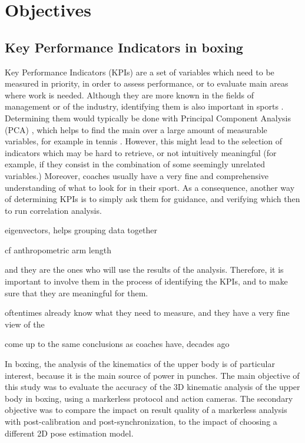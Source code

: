 \clearpage

\minitoc
\newpage






\section{Objectives}

\subsection{Key Performance Indicators in boxing}

Key Performance Indicators (KPIs) are a set of variables which need to be measured in priority, in order to assess performance, or to evaluate main areas where work is needed. Although they are more known in the fields of management or of the industry, identifying them is also important in sports \cite{Butterworth2013}. Determining them would typically be done with Principal Component Analysis (PCA) \cite{Hotelling1933}, which helps to find the main over a large amount of measurable variables, for example in tennis \cite{ODonoghue2008}. However, this might lead to the selection of indicators which may be hard to retrieve, or not intuitively meaningful (for example, if they consist in the combination of some seemingly unrelated variables.) Moreover, coaches usually have a very fine and comprehensive understanding of what to look for in their sport. As a consequence, another way of determining KPIs is to simply ask them for guidance, and verifying which then to run correlation analysis. 



eigenvectors, helps grouping data together


cf anthropometric arm length


and they are the ones who will use the results of the analysis. Therefore, it is important to involve them in the process of identifying the KPIs, and to make sure that they are meaningful for them.

oftentimes already know what they need to measure, and they have a very fine view of the 

come up to the same conclusions as coaches have, decades ago



In boxing, the analysis of the kinematics of the upper body is of particular interest, because it is the main source of power in punches. The main objective of this study was to evaluate the accuracy of the 3D kinematic analysis of the upper body in boxing, using a markerless protocol and action cameras. The secondary objective was to compare the impact on result quality of a markerless analysis with post-calibration and post-synchronization, to the impact of choosing a different 2D pose estimation model.


